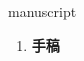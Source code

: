 
\begin{frame}
{\huge manuscript}
\begin{center}
\begin{enumerate}\Large
  \item \textbf{手稿}
\end{enumerate}
\end{center}
\end{frame}
